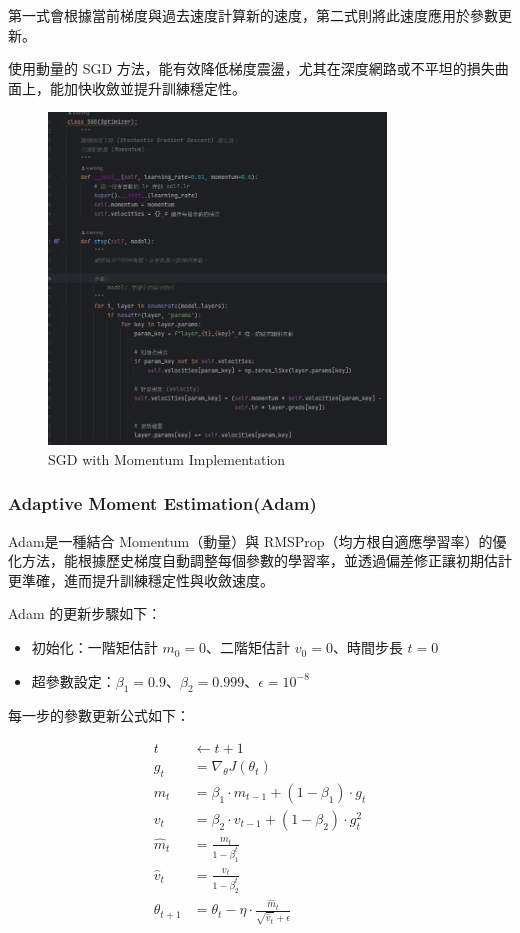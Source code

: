 \documentclass{article}
\begin{document}
第一式會根據當前梯度與過去速度計算新的速度，第二式則將此速度應用於參數更新。

使用動量的 SGD 方法，能有效降低梯度震盪，尤其在深度網路或不平坦的損失曲面上，能加快收斂並提升訓練穩定性。
\begin{figure}[H]
    \centering
    \includegraphics[width=0.8\textwidth]{Lab01_report/img/6.1SGD.png}
    \caption{SGD with Momentum Implementation}
    \label{fig:sgd_code}
\end{figure}


\subsubsection{Adaptive Moment Estimation(Adam)}

Adam是一種結合 Momentum（動量）與 RMSProp（均方根自適應學習率）的優化方法，能根據歷史梯度自動調整每個參數的學習率，並透過偏差修正讓初期估計更準確，進而提升訓練穩定性與收斂速度。

Adam 的更新步驟如下：

\begin{itemize}
  \item 初始化：一階矩估計 \(m_0 = 0\)、二階矩估計 \(v_0 = 0\)、時間步長 \(t = 0\)
  \item 超參數設定：\(\beta_1 = 0.9\)、\(\beta_2 = 0.999\)、\(\epsilon = 10^{-8}\)
\end{itemize}

每一步的參數更新公式如下：

\[
\begin{aligned}
t &\leftarrow t + 1 \\
g_t &= \nabla_\theta J(\theta_t) \\
m_t &= \beta_1 \cdot m_{t-1} + (1 - \beta_1) \cdot g_t \\
v_t &= \beta_2 \cdot v_{t-1} + (1 - \beta_2) \cdot g_t^2 \\
\hat{m}_t &= \frac{m_t}{1 - \beta_1^t} \\
\hat{v}_t &= \frac{v_t}{1 - \beta_2^t} \\
\theta_{t+1} &= \theta_t - \eta \cdot \frac{\hat{m}_t}{\sqrt{\hat{v}_t} + \epsilon}
\end{aligned}
\]
\end{document}
